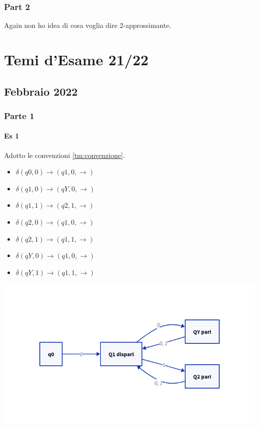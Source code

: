 \documentclass[a4paper,10pt,oneside]{book}
\begin{document}
\section{Part 2}

Again non ho idea di cosa voglia dire 2-approssimante.

\part{Temi d'Esame 21/22}

\chapter{Febbraio 2022}

\section{Parte 1}

\subsection{Es 1}

Adotto le convenzioni \ref{tm:convenzione}.

\begin{itemize}
    \item $\delta(q0, 0) \rightarrow (q1, 0, \rightarrow)$
    \item $\delta(q1, 0) \rightarrow (qY, 0, \rightarrow)$
    \item $\delta(q1, 1) \rightarrow (q2, 1, \rightarrow)$
    \item $\delta(q2, 0) \rightarrow (q1, 0, \rightarrow)$
    \item $\delta(q2, 1) \rightarrow (q1, 1, \rightarrow)$
    \item $\delta(qY, 0) \rightarrow (q1, 0, \rightarrow)$
    \item $\delta(qY, 1) \rightarrow (q1, 1, \rightarrow)$
\end{itemize}

\begin{center}
    \includegraphics[width=1\linewidth]{22_febbraio_01.png}
\end{center}
\end{document}

